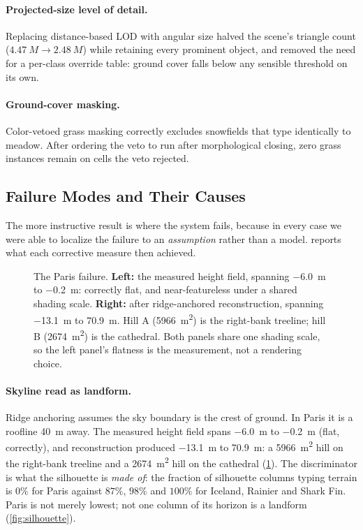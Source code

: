 \paragraph{Projected-size level of detail.}
Replacing distance-based LOD with angular size halved the scene's triangle count
($\SI{4.47}{M} \rightarrow \SI{2.48}{M}$) while retaining every prominent object,
and removed the need for a per-class override table: ground cover falls below
any sensible threshold on its own.

\paragraph{Ground-cover masking.}
Color-vetoed grass masking correctly excludes snowfields that type identically to
meadow. After ordering the veto to run after morphological closing, zero grass
instances remain on cells the veto rejected.

\subsection{Failure Modes and Their Causes}

The more instructive result is where the system fails, because in every case we
were able to localize the failure to an \emph{assumption} rather than a model.
 reports what each corrective measure then achieved.

\begin{figure}[t]
  \centering
  \caption{The Paris failure. \textbf{Left:} the measured height field, spanning
  \SI{-6.0}{\meter} to \SI{-0.2}{\meter}: correctly flat, and near-featureless
  under a shared shading scale. \textbf{Right:} after ridge-anchored reconstruction,
  spanning \SI{-13.1}{\meter} to \SI{+70.9}{\meter}. Hill \textsf{A}
  (\SI{5966}{\meter\squared}) is the right-bank treeline; hill \textsf{B}
  (\SI{2674}{\meter\squared}) is the cathedral. Both panels share one shading
  scale, so the left panel's flatness is the measurement, not a rendering choice.}
  \label{fig:paris-terrain}
\end{figure}

\paragraph{Skyline read as landform.}
Ridge anchoring assumes the sky boundary is the crest of ground. In Paris it is a
roofline \SI{40}{\meter} away. The measured height field spans
\SI{-6.0}{\meter} to \SI{-0.2}{\meter} (flat, correctly), and reconstruction
produced \SI{-13.1}{\meter} to \SI{+70.9}{\meter}: a \SI{5966}{\meter\squared}
hill on the right-bank treeline and a \SI{2674}{\meter\squared} hill on the
cathedral (\cref{fig:paris-terrain}). The discriminator is what the silhouette is \emph{made of}: the fraction
of silhouette columns typing terrain is $0\%$ for Paris against $87\%$, $98\%$ and
$100\%$ for Iceland, Rainier and Shark Fin. Paris is not merely lowest; not one
column of its horizon is a landform (\cref{fig:silhouette}).

